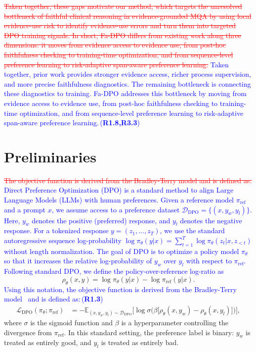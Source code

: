 \documentclass[a4paper,fleqn,doubleblind]{cas-sc}
\DeclareRobustCommand{\deleted}[1]{\textcolor{red}{\sout{#1}}}
\DeclareRobustCommand{\added}[1]{\textcolor{blue}{#1}}
\DeclareRobustCommand{\revtag}[1]{\textcolor{blue}{\scriptsize\,(\textbf{#1})}}
\begin{document}
\deleted{Taken together, these gaps motivate our method, which targets the unresolved bottleneck of faithful clinical reasoning in evidence-grounded MQA by using local evidence-use risk to identify evidence-use errors and turn them into targeted DPO training signals. In short, Fa-DPO differs from existing work along three dimensions: it moves from evidence access to evidence use, from post-hoc faithfulness checking to training-time optimization, and from sequence-level preference learning to risk-adaptive span-aware preference learning.}
\added{Taken together, prior work provides stronger evidence access, richer process supervision, and more precise faithfulness diagnostics. The remaining bottleneck is connecting these diagnostics to training. Fa-DPO addresses this bottleneck by moving from evidence access to evidence use, from post-hoc faithfulness checking to training-time optimization, and from sequence-level preference learning to risk-adaptive span-aware preference learning.}\revtag{R1.8,R3.3}

\section{Preliminaries}
\label{sec:preliminaries}

\deleted{The objective function is derived from the Bradley-Terry model and is defined as:}
\added{Direct Preference Optimization (DPO) is a standard method to align Large Language Models (LLMs) with human preferences.}
\added{Given a reference model $\pi_{\text{ref}}$ and a prompt $x$, we assume access to a preference dataset $\mathcal{D}_{\text{DPO}} = \{(x, y_w, y_l)\}$.}
\added{Here, $y_w$ denotes the positive (preferred) response, and $y_l$ denotes the negative response.}
\added{For a tokenized response $y=(z_1,\dots,z_T)$, we use the standard autoregressive sequence log-probability $\log \pi_\theta(y|x)=\sum_{t=1}^{T}\log \pi_\theta(z_t|x,z_{<t})$ without length normalization.}
\added{The goal of DPO is to optimize a policy model $\pi_\theta$ so that it increases the relative log-probability of $y_w$ over $y_l$ with respect to $\pi_{\text{ref}}$.}
\added{Following standard DPO, we define the policy-over-reference log-ratio as}
\begingroup
\color{blue}
\[
\rho_\theta(x,y)
=
\log \pi_\theta(y|x)
-
\log \pi_{\text{ref}}(y|x).
\]
\endgroup
\added{Using this notation, the objective function is derived from the Bradley-Terry model~\cite{bradley1952rank} and is defined as:}\revtag{R1.3}
\begin{equation}
\begin{split}
\mathcal{L}_{\text{DPO}}(\pi_\theta; \pi_{\text{ref}})
&= - \mathbb{E}_{(x, y_w, y_l) \sim \mathcal{D}_{\text{DPO}}} \Big[ \log \sigma \Big( \beta \big[\rho_\theta(x,y_w)-\rho_\theta(x,y_l)\big] \Big) \Big],
\end{split}
\end{equation}
where $\sigma$ is the sigmoid function and $\beta$ is a hyperparameter controlling the divergence from $\pi_{\text{ref}}$.
In this standard setting, the preference label is binary: $y_w$ is treated as entirely good, and $y_l$ is treated as entirely bad.
\end{document}
